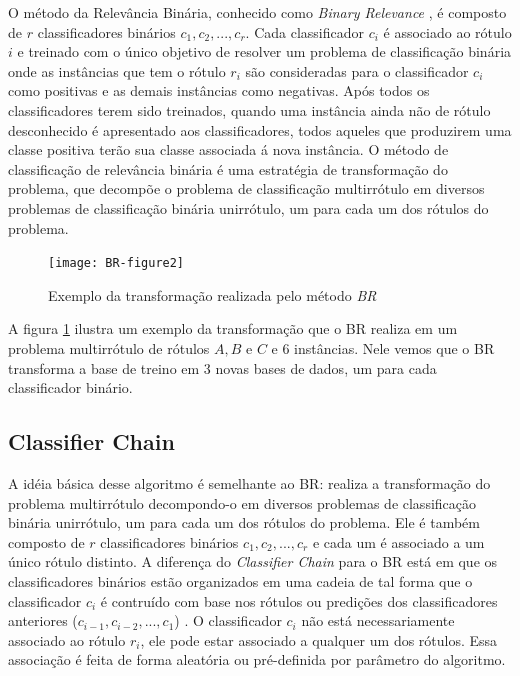 O método da Relevância Binária, conhecido como \textit{Binary Relevance} \cite{br2010}, 
é composto de $r$ classificadores binários $c_1,c_2,...,c_r$. Cada classificador $c_i$ 
é associado ao rótulo $i$ e treinado com o único objetivo de resolver
um problema de classificação binária onde as instâncias que
tem o rótulo $r_i$ são consideradas para o classificador $c_i$ como positivas
e as demais instâncias como
negativas. 
Após todos os classificadores terem sido treinados, quando uma instância
ainda não de rótulo desconhecido 
é apresentado aos classificadores, todos aqueles que produzirem uma classe positiva
terão sua classe associada á nova instância.
O método de classificação de relevância binária é uma estratégia de transformação do
problema, que decompõe o problema de classificação multirrótulo em diversos problemas
de classificação binária unirrótulo, um para cada um dos rótulos do problema.

\begin{figure}
 \texttt{[image: BR-figure2]}
 
 \caption{Exemplo da transformação realizada pelo método \textit{BR}}
\label{fig:br}

\end{figure}

A figura \ref{fig:br} ilustra um exemplo da transformação que o BR realiza em um problema multirrótulo
de rótulos $A,B$ e $C$ e 6 instâncias. Nele vemos que o BR transforma a base de treino em 3 novas bases
de dados, um para cada classificador binário.





\subsection{Classifier Chain}


A idéia básica desse algoritmo é semelhante ao BR: realiza a transformação do
problema multirrótulo decompondo-o em diversos problemas
de classificação binária unirrótulo, um para cada um dos rótulos do problema.
Ele é também composto de $r$ classificadores binários $c_1,c_2,...,c_r$ e cada um
é associado a um único rótulo distinto. A diferença do \textit{Classifier Chain} para o BR está
em que os classificadores binários estão organizados em uma cadeia de tal forma que
o classificador $c_i$ é contruído com base nos rótulos ou predições dos classificadores anteriores
($c_{i-1},c_{i-2},...,c_{1}$) \cite{cc2009}. O classificador $c_i$ não está necessariamente associado ao rótulo $r_i$,
ele pode estar associado a qualquer um dos rótulos.
Essa associação é feita de forma aleatória ou pré-definida por parâmetro do algoritmo.


